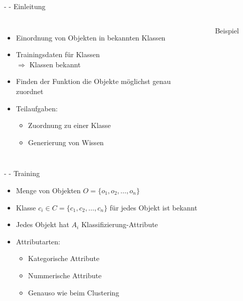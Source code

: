 \documentclass[fleqn,11pt,aspectratio=43]{beamer}
\begin{document}
\begin{frame}{\insertsectionhead - \insertsubsectionhead - Einleitung \cite{ester2000knowledge}}
\begin{columns}[onlytextwidth]
\begin{itemize}
\item Einordnung von Objekten in bekannten Klassen
\item Trainingsdaten für Klassen \\$\Rightarrow$ Klassen bekannt
\item Finden der Funktion die Objekte möglichst genau zuordnet
\item Teilaufgaben:
\begin{itemize}
\item Zuordnung zu einer Klasse
\item Generierung von Wissen 
\end{itemize}
\end{itemize}
\begin{figure}
\scalebox{.6}{}
\caption{Beispiel}
\end{figure}
\end{columns}

\end{frame}

\begin{frame}{\insertsectionhead - \insertsubsectionhead - Training \cite{ester2000knowledge}}
\begin{itemize}
\item Menge von Objekten $O = \{o_1, o_2, \ldots, o_n\}$
\item Klasse $c_i \in C = \{c_1, c_2, \ldots, c_n\}$ für jedes Objekt ist bekannt
\item Jedes Objekt hat $A_i$ Klassifizierung-Attribute
\item Attributarten:
\begin{itemize}
\item Kategorische Attribute
\item Nummerische Attribute
\item Genauso wie beim Clustering
\end{itemize}
\end{itemize}
\end{frame}
\end{document}
